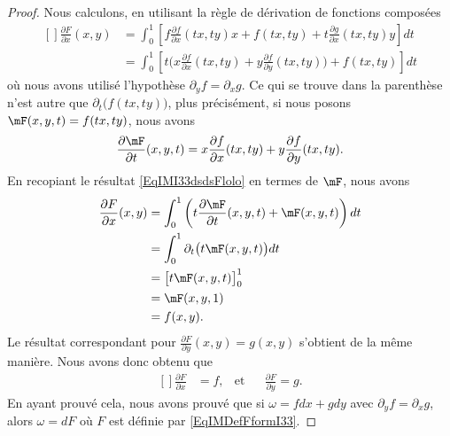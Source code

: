 \begin{proof}
	Nous calculons, en utilisant la règle de dérivation de fonctions composées
	\begin{equation}		\label{EqIMI33dsdsFlolo}
		\begin{aligned}[]
			\frac{ \partial F }{ \partial x }(x,y) & =\int_0^1\left[   f\frac{ \partial f }{ \partial x }(tx,ty)x+f(tx,ty)+t\frac{ \partial g }{ \partial x }(tx,ty)y  \right]dt         \\
			                                       & =\int_0^1\left[ t\Big( x\frac{ \partial f }{ \partial x }(tx,ty)+y\frac{ \partial f }{ \partial y }(tx,ty) \Big)+f(tx,ty) \right]dt
		\end{aligned}
	\end{equation}
	où nous avons utilisé l'hypothèse \( \partial_yf=\partial_xg\). Ce qui se trouve dans la parenthèse n'est autre que \( \partial_t\big( f(tx,ty) \big)\), plus précisément, si nous posons \( \mF(x,y,t)=f(tx,ty)\), nous avons
	\begin{equation}
		\frac{ \partial \mF }{ \partial t }(x,y,t)= x\frac{ \partial f }{ \partial x }(tx,ty)+y\frac{ \partial f }{ \partial y }(tx,ty).
	\end{equation}
	En recopiant le résultat \eqref{EqIMI33dsdsFlolo} en termes de \( \mF\), nous avons
	\begin{equation}
		\begin{aligned}[]
			\frac{ \partial F }{ \partial x }(x,y) & =\int_0^1\left( t\frac{ \partial \mF }{ \partial t }(x,y,t)+\mF(x,y,t) \right)dt \\
			                                       & =\int_0^1\partial_t\big( t\mF(x,y,t) \big)dt                                     \\
			                                       & =\big[ t\mF(x,y,t) \big]_0^1                                                     \\
			                                       & =\mF(x,y,1)                                                                      \\
			                                       & =f(x,y).
		\end{aligned}
	\end{equation}
	Le résultat correspondant pour \( \frac{ \partial F }{ \partial y }(x,y)=g(x,y)\) s'obtient de la même manière. Nous avons donc obtenu que
	\begin{equation}		\label{EqIMFormI33Fffdd}
		\begin{aligned}[]
			\frac{ \partial F }{ \partial x } & =f, & \text{et} &  & \frac{ \partial F }{ \partial y }=g.
		\end{aligned}
	\end{equation}
	En ayant prouvé cela, nous avons prouvé que si \( \omega=fdx+gdy\) avec \( \partial_yf=\partial_xg\), alors \( \omega=dF\) où \( F\) est définie par \eqref{EqIMDefFformI33}.
\end{proof}

